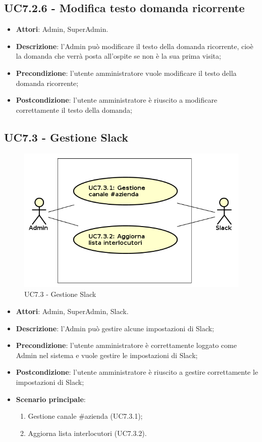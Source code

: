 \documentclass[../AnalisiDeiRequisiti.tex]{subfiles}
\begin{document}
\subsection{UC7.2.6 - Modifica testo domanda ricorrente} 
\label{sssec:UC7.2.6} 
\begin{itemize} 
\item \textbf{Attori}: Admin, SuperAdmin.
\item \textbf{Descrizione}: l'Admin può modificare il testo della domanda ricorrente, cioè la domanda che verrà posta all'ospite se non è la sua prima visita;
\item \textbf{Precondizione}: l'utente amministratore vuole modificare il testo della domanda ricorrente;
\item \textbf{Postcondizione}: l'utente amministratore è riuscito a modificare correttamente il testo della domanda;
\end{itemize} 
\subsection{UC7.3 - Gestione Slack} 
\label{sssec:UC7.3} 
\begin{figure}[!h]
	\centering
	\includegraphics[width=\textwidth]{UseCases/UC7_GestionePannelloAdmin/UC7_3_GestioneSlack/UC7_3_GestioneSlack.png}
	\caption{UC7.3 - Gestione Slack}
\end{figure}
\begin{itemize} 
\item \textbf{Attori}: Admin, SuperAdmin, Slack.
\item \textbf{Descrizione}: l'Admin può gestire alcune impostazioni di Slack;
\item \textbf{Precondizione}: l'utente amministratore è correttamente loggato come Admin nel sistema e vuole gestire le impostazioni di Slack;
\item \textbf{Postcondizione}: l'utente amministratore è riuscito a gestire correttamente le impostazioni di Slack;
\item \textbf{Scenario principale}: \begin{enumerate}\item Gestione canale \#azienda (UC7.3.1);\item Aggiorna lista interlocutori (UC7.3.2). 
 \end{enumerate}
\end{itemize} 
\end{document}
